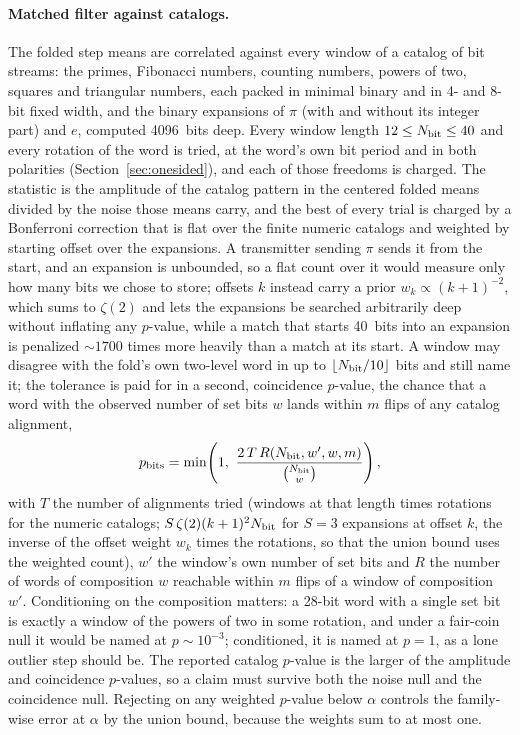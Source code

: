 \documentclass[final,5p]{elsarticle}
\begin{document}
\paragraph{Matched filter against catalogs.} The folded step means are correlated against every window of a catalog of bit streams: the primes, Fibonacci numbers, counting numbers, powers of two, squares and triangular numbers, each packed in minimal binary and in 4- and 8-bit fixed width, and the binary expansions of $\pi$ (with and without its integer part) and $e$, computed 4096~bits deep. Every window length $12\le N_{\rm bit}\le40$ and every rotation of the word is tried, at the word's own bit period and in both polarities (Section~\ref{sec:onesided}), and each of those freedoms is charged. The statistic is the amplitude of the catalog pattern in the centered folded means divided by the noise those means carry, and the best of every trial is charged by a Bonferroni correction that is flat over the finite numeric catalogs and weighted by starting offset over the expansions. A transmitter sending $\pi$ sends it from the start, and an expansion is unbounded, so a flat count over it would measure only how many bits we chose to store; offsets $k$ instead carry a prior $w_k\propto(k+1)^{-2}$, which sums to $\zeta(2)$ and lets the expansions be searched arbitrarily deep without inflating any $p$-value, while a match that starts 40~bits into an expansion is penalized $\sim1700$ times more heavily than a match at its start. A window may disagree with the fold's own two-level word in up to $\lfloor N_{\rm bit}/10\rfloor$ bits and still name it; the tolerance is paid for in a second, coincidence $p$-value, the chance that a word with the observed number of set bits $w$ lands within $m$ flips of any catalog alignment,
\begin{equation}
  p_{\rm bits} = \min\!\left(1,\ \frac{2\,T\,R(N_{\rm bit},w',w,m)}{\binom{N_{\rm bit}}{w}}\right),
  \label{eq:pbits}
\end{equation}
with $T$ the number of alignments tried (windows at that length times rotations for the numeric catalogs; $S\,\zeta(2)(k+1)^2N_{\rm bit}$ for $S=3$ expansions at offset $k$, the inverse of the offset weight $w_k$ times the rotations, so that the union bound uses the weighted count), $w'$ the window's own number of set bits and $R$ the number of words of composition $w$ reachable within $m$ flips of a window of composition $w'$. Conditioning on the composition matters: a 28-bit word with a single set bit is exactly a window of the powers of two in some rotation, and under a fair-coin null it would be named at $p\sim10^{-3}$; conditioned, it is named at $p=1$, as a lone outlier step should be. The reported catalog $p$-value is the larger of the amplitude and coincidence $p$-values, so a claim must survive both the noise null and the coincidence null. Rejecting on any weighted $p$-value below $\alpha$ controls the family-wise error at $\alpha$ by the union bound, because the weights sum to at most one.
\end{document}
